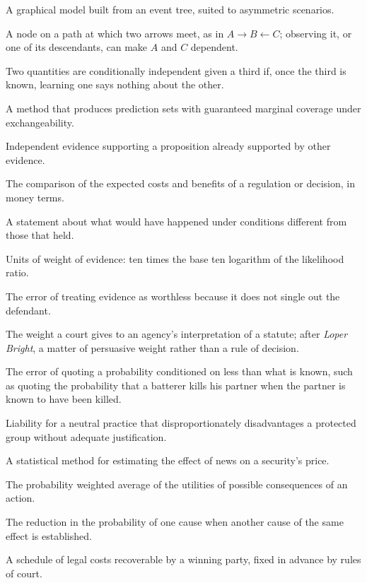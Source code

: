 \begin{description}[style=nextline,leftmargin=1.2em,itemsep=4pt]
\item[Chain event graph] A graphical model built from an event tree, suited to asymmetric scenarios.
\item[Collider] A node on a path at which two arrows meet, as in $A\to B\leftarrow C$; observing it, or one of its descendants, can make $A$ and $C$ dependent.
\item[Conditional independence] Two quantities are conditionally independent given a third if, once the third is known, learning one says nothing about the other.
\item[Conformal prediction] A method that produces prediction sets with guaranteed marginal coverage under exchangeability.
\item[Corroboration] Independent evidence supporting a proposition already supported by other evidence.
\item[Cost benefit analysis] The comparison of the expected costs and benefits of a regulation or decision, in money terms.
\item[Counterfactual] A statement about what would have happened under conditions different from those that held.
\item[Decibans] Units of weight of evidence: ten times the base ten logarithm of the likelihood ratio.
\item[Defence fallacy] The error of treating evidence as worthless because it does not single out the defendant.
\item[Deference] The weight a court gives to an agency's interpretation of a statute; after \emph{Loper Bright}, a matter of persuasive weight rather than a rule of decision.
\item[Dershowitz fallacy] The error of quoting a probability conditioned on less than what is known, such as quoting the probability that a batterer kills his partner when the partner is known to have been killed.
\item[Disparate impact] Liability for a neutral practice that disproportionately disadvantages a protected group without adequate justification.
\item[Event study] A statistical method for estimating the effect of news on a security's price.
\item[Expected utility] The probability weighted average of the utilities of possible consequences of an action.
\item[Explaining away] The reduction in the probability of one cause when another cause of the same effect is established.
\item[Fixed recoverable costs] A schedule of legal costs recoverable by a winning party, fixed in advance by rules of court.

\end{description}
